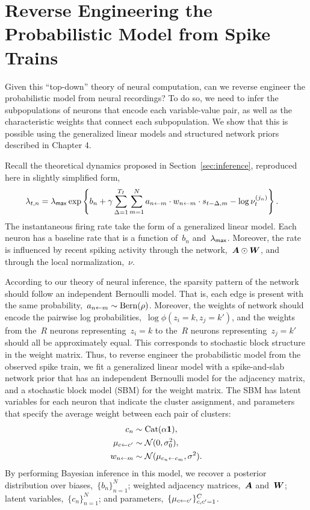\section{Reverse Engineering the Probabilistic Model from Spike Trains}

Given this ``top-down'' theory of neural computation, can we reverse
engineer the probabilistic model from neural recordings? To do so, we
need to infer the subpopulations of neurons that encode each
variable-value pair, as well as the characteristic weights that
connect each subpopulation.  We show that this is possible using the
generalized linear models and structured network priors described in
Chapter 4.


Recall the theoretical dynamics proposed in Section~\ref{sec:inference},
 reproduced here in slightly simplified form,
\begin{align}
  \lambda_{t,n} &= \lambda_{\mathsf{max}}
  \exp \left \{b_n + \gamma \sum_{\Delta=1}^{T_I} \sum_{m=1}^N a_{n \leftarrow m} \cdot w_{n \leftarrow m} \cdot s_{t-\Delta,m}
  - \log \nu_t^{(j_n)} \right \}.
\end{align}
The instantaneous firing rate take the form of a generalized linear model.
Each neuron has a baseline rate that is a function of~$b_n$ and~$\lambda_{\mathsf{max}}$.
Moreover, the rate is influenced by recent spiking activity through
the network,~$\boldsymbol{A} \odot \boldsymbol{W}$, and through the local normalization,~$\nu$. 

According to our theory of neural inference, the sparsity pattern of
the network should follow an independent Bernoulli model. That is,
each edge is present with the same probability,~${a_{n \leftarrow m} \sim
  \mathrm{Bern}(\rho)}$.  Moreover, the weights of network should
encode the pairwise log probabilities,~${\log \phi(z_i=k, z_j=k')}$,
and the weights from the~$R$ neurons representing~${z_i=k}$ to the~$R$
neurons representing~${z_j=k'}$ should all be approximately
equal. This corresponds to stochastic block structure in the weight
matrix. Thus, to reverse engineer the probabilistic model from the
observed spike train, we fit a generalized linear model with a
spike-and-slab network prior that has an independent Bernoulli model
for the adjacency matrix, and a stochastic block model (SBM) for the
weight matrix. The SBM has latent variables for each neuron that
indicate the cluster assignment, and parameters that specify the
average weight between each pair of clusters:
\begin{align}
  c_n & \sim \mathrm{Cat}(\alpha \boldsymbol{1}), \\
  \mu_{c \leftarrow c'} &\sim \mathcal{N}(0, \sigma_0^2), \\
  w_{n \leftarrow m} &\sim \mathcal{N}(\mu_{c_n \leftarrow c_m}, \sigma^2).
\end{align}
By performing Bayesian inference in this model, we recover a posterior
distribution over biases,~$\{b_n\}_{n=1}^N$; weighted adjacency
matrices,~$\boldsymbol{A}$ and~$\boldsymbol{W}$; latent variables,~$\{c_n\}_{n=1}^N$; and
parameters,~$\{\mu_{c \leftarrow c'}\}_{c,c'=1}^C$.

